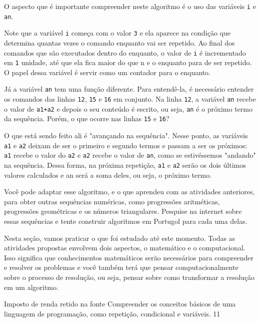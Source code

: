 O aspecto que é importante compreender neste algoritmo é o uso das variáveis \verb|i| e \verb|an|.

Note que a variável \verb|i| começa com o valor \verb|3| e ela aparece na condição que determina quantas vezes o comando enquanto vai ser repetido. Ao final dos comandos que são executados dentro do enquanto, o valor de \verb|i| é incrementado em \verb|1| unidade, até que ela fica maior do que n e o enquanto para de ser repetido. O papel dessa variável é servir como um contador para o enquanto.

Já a variável \verb|an| tem uma função diferente. Para entendê-la, é necessário entender os comandos das linhas \verb|12|, \verb|15| e \verb|16| em conjunto. Na linha \verb|12|, a variável \verb|an| recebe o valor de \verb|a1+a2| e depois o seu conteúdo é escrito, ou seja, \verb|an| é o próximo termo da sequência. Porém, o que ocorre nas linhas \verb|15| e \verb|16|?


O que está sendo feito ali é "avançando na sequência". Nesse ponto, as variáveis \verb|a1| e \verb|a2| deixam de ser o primeiro e segundo termos e passam a ser os próximos: \verb|a1| recebe o valor do \verb|a2| e \verb|a2| recebe o valor de \verb|an|, como se estivéssemos "andando"{} na sequência. Dessa forma, na próxima repetição, \verb|a1| e \verb|a2| serão os dois últimos valores calculados e an será a soma deles, ou seja, o próximo termo.

Você pode adaptar esse algoritmo, e o que aprendeu com as atividades anteriores, para obter outras sequências numéricas, como progressões aritméticas, progressões geométricas e os números triangulares. Pesquise na internet sobre essas sequências e tente construir algoritmos em Portugol para cada uma delas.

\practice{}
\label{comp-prac1}

Nesta seção, vamos praticar o que foi estudado até este momento. Todas as atividades propostas envolvem dois aspectos, o matemático e o computacional. Isso significa que conhecimentos matemáticos serão necessários para compreender e resolver os problemas e você também terá que pensar computacionalmente sobre o processo de resolução, ou seja, pensar sobre como transformar a resolução em um algoritmo.

\marginpar{\vspace{-1em}}
\begin{objectives}{Imposto de renda retido na fonte}
{
Compreender os conceitos básicos de uma linguagem de programação, como repetição, condicional e variáveis.
}{1}{1}
\end{objectives}

